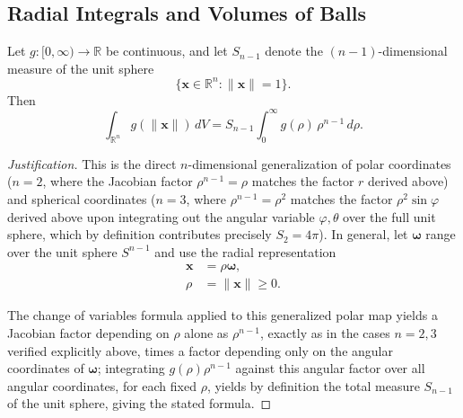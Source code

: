 \subsection{Radial Integrals and Volumes of Balls}

\begin{lemma}
Let $g : [0,\infty) \to \mathbb{R}$ be continuous, and let $S_{n-1}$ denote the $(n-1)$-dimensional measure of the unit sphere
\[
\{\mathbf{x} \in \mathbb{R}^n : \|\mathbf{x}\|=1\}.
\]
Then
\[
\int_{\mathbb{R}^n} g(\|\mathbf{x}\|)\, dV = S_{n-1} \int_0^{\infty} g(\rho)\, \rho^{n-1}\, d\rho.
\]

\end{lemma}

\begin{proof}[Justification]
This is the direct $n$-dimensional generalization of polar coordinates ($n=2$, where the Jacobian factor $\rho^{n-1}=\rho$ matches the factor $r$ derived above) and spherical coordinates ($n=3$, where $\rho^{n-1}=\rho^2$ matches the factor $\rho^2\sin\varphi$ derived above upon integrating out the angular variable $\varphi,\theta$ over the full unit sphere, which by definition contributes precisely $S_2 = 4\pi$). In general, let $\boldsymbol{\omega}$ range over the unit sphere $S^{n-1}$ and use the radial representation
\[
\begin{aligned}
\mathbf{x} &= \rho\boldsymbol{\omega}, \\
\rho &= \|\mathbf{x}\| \geq 0.
\end{aligned}
\]

The change of variables formula applied to this generalized polar map yields a Jacobian factor depending on $\rho$ alone as $\rho^{n-1}$, exactly as in the cases $n=2,3$ verified explicitly above, times a factor depending only on the angular coordinates of $\boldsymbol\omega$; integrating $g(\rho)\rho^{n-1}$ against this angular factor over all angular coordinates, for each fixed $\rho$, yields by definition the total measure $S_{n-1}$ of the unit sphere, giving the stated formula.
\end{proof}

